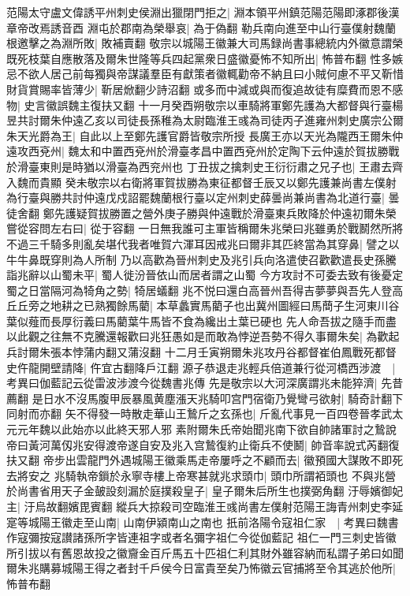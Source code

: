 范陽太守盧文偉誘平州刺史侯淵出獵閉門拒之|{
	淵本領平州鎮范陽范陽即涿郡後漢章帝改焉誘音酉}
淵屯於郡南為榮舉哀|{
	為于偽翻}
勒兵南向進至中山行臺僕射魏蘭根邀擊之為淵所敗|{
	敗補賣翻}
敬宗以城陽王徽兼大司馬録尚書事總統内外徽意謂榮既死枝葉自應散落及爾朱世隆等兵四起黨衆日盛徽憂怖不知所出|{
	怖普布翻}
性多嫉忌不欲人居己前每獨與帝謀議羣臣有獻策者徽輒勸帝不納且曰小賊何慮不平又靳惜財貨賞賜率皆薄少|{
	靳居焮翻少詩沼翻}
或多而中減或與而復追故徒有糜費而恩不感物|{
	史言徽誤魏主復扶又翻}
十一月癸酉朔敬宗以車騎將軍鄭先護為大都督與行臺楊昱共討爾朱仲遠乙亥以司徒長孫稚為太尉臨淮王彧為司徒丙子進雍州刺史廣宗公爾朱天光爵為王|{
	自此以上至鄭先護官爵皆敬宗所授}
長廣王亦以天光為隴西王爾朱仲遠攻西兗州|{
	魏太和中置西兗州於滑臺孝昌中置西兗州於定陶下云仲遠於賀拔勝戰於滑臺東則是時猶以滑臺為西兖州也}
丁丑拔之擒刺史王衍衍肅之兄子也|{
	王肅去齊入魏而貴顯}
癸未敬宗以右衛將軍賀拔勝為東征都督壬辰又以鄭先護兼尚書左僕射為行臺與勝共討仲遠戊戍詔罷魏蘭根行臺以定州刺史薛曇尚兼尚書為北道行臺|{
	曇徒舍翻}
鄭先護疑賀拔勝置之營外庚子勝與仲遠戰於滑臺東兵敗降於仲遠初爾朱榮嘗從容問左右曰|{
	從于容翻}
一日無我誰可主軍皆稱爾朱兆榮曰兆雖勇於戰鬭然所將不過三千騎多則亂矣堪代我者唯賀六渾耳因戒兆曰爾非其匹終當為其穿鼻|{
	譬之以牛牛鼻既穿則為人所制}
乃以高歡為晉州刺史及兆引兵向洛遣使召歡歡遣長史孫騰詣兆辭以山蜀未平|{
	蜀人徙汾晉依山而居者謂之山蜀}
今方攻討不可委去致有後憂定蜀之日當隔河為犄角之勢|{
	犄居蟻翻}
兆不悦曰還白高晉州吾得吉夢夢與吾先人登高丘丘旁之地耕之已熟獨餘馬藺|{
	本草蠡實馬藺子也出冀州圖經曰馬蕳子生河東川谷葉似薤而長厚衍義曰馬藺葉牛馬皆不食為纔出土葉已硬也}
先人命吾拔之隨手而盡以此觀之往無不克騰還報歡曰兆狂愚如是而敢為悖逆吾勢不得久事爾朱矣|{
	為歡起兵討爾朱張本悖蒲内翻又蒲沒翻}
十二月壬寅朔爾朱兆攻丹谷都督崔伯鳳戰死都督史仵龍開壁請降|{
	仵宜古翻降戶江翻}
源子恭退走兆輕兵倍道兼行從河橋西涉渡　|{
	考異曰伽藍記云從雷波涉渡今從魏書兆傳}
先是敬宗以大河深廣謂兆未能猝濟|{
	先昔薦翻}
是日水不沒馬腹甲辰暴風黄塵漲天兆騎叩宫門宿衛乃覺彎弓欲射|{
	騎奇計翻下同射而亦翻}
矢不得發一時散走華山王鷙斤之玄孫也|{
	斤亂代事見一百四卷晉孝武太元元年魏以此始亦以此終天邪人邪}
素附爾朱氏帝始聞兆南下欲自帥諸軍討之鷙說帝曰黃河萬仭兆安得渡帝遂自安及兆入宫鷙復約止衛兵不使鬭|{
	帥音率說式芮翻復扶又翻}
帝步出雲龍門外遇城陽王徽乘馬走帝屢呼之不顧而去|{
	徽預國大謀敗不即死去將安之}
兆騎執帝鎻於永寧寺樓上帝寒甚就兆求頭巾|{
	頭巾所謂袹頭也}
不與兆營於尚書省用天子金皷設刻漏於庭撲殺皇子|{
	皇子爾朱后所生也撲弼角翻}
汙辱嬪御妃主|{
	汙烏故翻嬪毘賓翻}
縱兵大掠殺司空臨淮王彧尚書左僕射范陽王誨青州刺史李延寔等城陽王徽走至山南|{
	山南伊潁南山之南也}
扺前洛陽令寇祖仁家　|{
	考異曰魏書作寇彌按寇讃諸孫所字皆連祖字或者名彌字祖仁今從伽藍記}
祖仁一門三刺史皆徽所引拔以有舊恩故投之徽齎金百斤馬五十匹祖仁利其財外雖容納而私謂子弟曰如聞爾朱兆購募城陽王得之者封千戶侯今日富貴至矣乃怖徽云官捕將至令其逃於他所|{
	怖普布翻}
